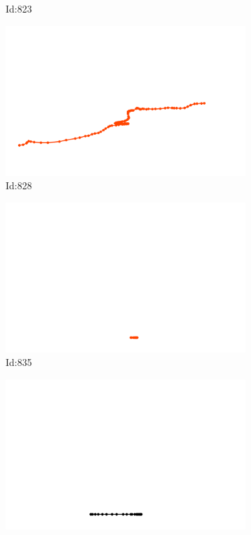 \documentclass[12pt,twoside]{report}
\begin{document}
\begin{figure}
\begin{subfigure}[b]{0.20\textwidth}
\caption{Id:823}
\end{subfigure}
\begin{subfigure}[b]{0.20\textwidth}
\centering
\includegraphics[width=\textwidth]{../trajectories/828.png}
\caption{Id:828}
\end{subfigure}
\begin{subfigure}[b]{0.20\textwidth}
\centering
\includegraphics[width=\textwidth]{../trajectories/835.png}
\caption{Id:835}
\end{subfigure}
\begin{subfigure}[b]{0.20\textwidth}
\centering
\includegraphics[width=\textwidth]{../trajectories/836.png}

\end{subfigure}
\end{figure}
\end{document}

